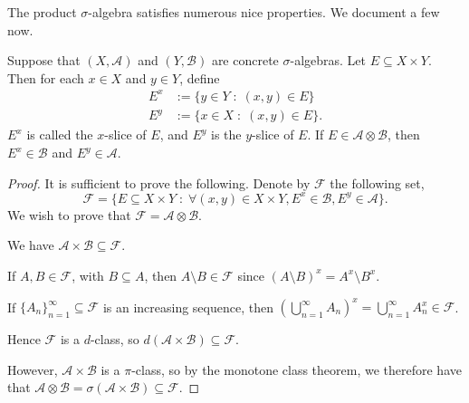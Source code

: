 \documentclass{owmaths}
\begin{document}
The product $\sigma$-algebra satisfies numerous nice properties. We document a
few now.
\begin{proposition}
    Suppose that $(X,\mathcal{A})$ and $(Y,\mathcal{B})$ are concrete $\sigma$-algebras.
    Let $E \subseteq X\times Y$. Then for each $x \in X$ and $y \in Y$,
    define
    \begin{align*}
        E^x &:= \{y \in Y\;:\;(x,y) \in E\}\\
        E^y &:= \{x \in X\;:\;(x,y) \in E\}.
    \end{align*}
    $E^x$ is called the $x$-slice of $E$, and $E^y$ is the $y$-slice of $E$. 
    If $E \in \mathcal{A} \otimes \mathcal{B}$, then $E^x \in \mathcal{B}$
    and $E^y \in \mathcal{A}$.
\end{proposition}
\begin{proof}
    It is sufficient to prove the following. Denote by $\mathcal{F}$
    the following set,
    \begin{equation*}
        \mathcal{F} = \{E \subseteq X\times Y\;:\;\forall (x,y) \in X\times Y, E^x \in \mathcal{B},E^y \in \mathcal{A}\}.
    \end{equation*}
    We wish to prove that $\mathcal{F} = \mathcal{A}\otimes \mathcal{B}$.
       
    We have $\mathcal{A} \times \mathcal{B} \subseteq \mathcal{F}$.
   
    If $A,B \in \mathcal{F}$, with $B \subseteq A$, then $A \setminus B \in \mathcal{F}$
    since $(A \setminus B)^x = A^x \setminus B^x$.
    
    If $\{A_n\}_{n=1}^\infty \subseteq \mathcal{F}$ is an increasing sequence,
    then $\left(\bigcup_{n=1}^\infty A_n\right)^x = \bigcup_{n=1}^\infty A_n^x \in \mathcal{F}$.
    
    Hence $\mathcal{F}$ is a $d$-class, so $d(\mathcal{A}\times\mathcal{B}) \subseteq \mathcal{F}$.
    
    However, $\mathcal{A}\times\mathcal{B}$ is a $\pi$-class, so
    by the monotone class theorem, we therefore have that $\mathcal{A}\otimes\mathcal{B} = \sigma(\mathcal{A}\times\mathcal{B}) \subseteq \mathcal{F}$.
    
\end{proof}
\end{document}
